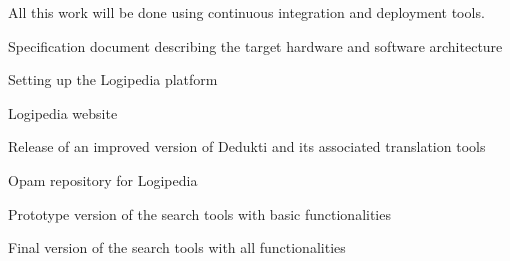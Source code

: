 \begin{workpackage}[id=access,type=RTD,wphases=1-48,
  short=Access,%
  title={Access},
  lead=Inr,InrRM=48,OcaRM=6,EduRM=12]
\begin{tasklist}
\begin{task}[id=dedukti,
      title=Development of Dedukti checking and translation tools,
      lead=Inr,InrRM=18,wphases=13-36]
    All this work will be done using continuous integration and
    deployment tools.
  \end{task}
  
\end{tasklist}


\begin{wpdelivs}

  
  \begin{wpdeliv}[due=6,id=archi,dissem=PU,nature=DEM,lead=Inr]{Specification document describing the target hardware and software architecture}
  \end{wpdeliv}

  \begin{wpdeliv}[due=12,id=platform,dissem=PU,nature=DEC,lead=Inr]{Setting up the Logipedia platform}
  \end{wpdeliv}

  \begin{wpdeliv}[due=24,miles=platform,id=web,dissem=PU,nature=DEC,lead=Inr]{Logipedia website}
  \end{wpdeliv}

  \begin{wpdeliv}[due=24,id=dedukti,dissem=PU,nature=OTHER,lead=Inr]{Release of an improved version of Dedukti and its associated translation tools}
  \end{wpdeliv}

  
  \begin{wpdeliv}[due=18,miles=platform, id=opam,dissem=PU,nature=OTHER,lead=Oca]{Opam repository for Logipedia}
  \end{wpdeliv}

  
  \begin{wpdeliv}[due=17,id=search1,dissem=PU,nature=DEM,lead=Inr]{Prototype version of the search tools with basic functionalities}
  \end{wpdeliv}

  \begin{wpdeliv}[due=30,id=search2,dissem=PU,nature=OTHER,lead=Inr]{Final version of the search tools with all functionalities}
  \end{wpdeliv}
    
\end{wpdelivs}

\end{workpackage}

